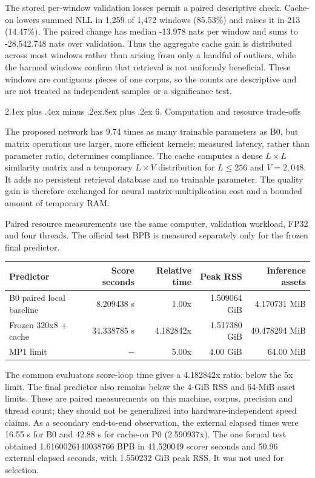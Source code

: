 \documentclass[11pt]{article}
\makeatletter
\renewcommand\section{\@startsection{section}{1}{0pt}%
  {2.1ex plus .4ex minus .2ex}{.8ex plus .2ex}%
  {\normalfont\large\bfseries}}
\makeatother
\begin{document}
The stored per-window validation losses permit a paired descriptive
check. Cache-on lowers summed NLL in 1,259 of 1,472 windows (85.53\%) and
raises it in 213 (14.47\%). The paired change has median -13.978 nats per
window and sums to -28,542.748 nats over validation. Thus the aggregate
cache gain is distributed across most windows rather than arising from
only a handful of outliers, while the harmed windows confirm that
retrieval is not uniformly beneficial. These windows are contiguous
pieces of one corpus, so the counts are descriptive and are not treated
as independent samples or a significance test.

\section{6. Computation and resource
trade-offs}\label{6-computation-and-resource-trade-offs}

The proposed network has 9.74 times as many trainable parameters as B0,
but matrix operations use larger, more efficient kernels; measured
latency, rather than parameter ratio, determines compliance. The cache
computes a dense \(L\times L\) similarity matrix and a temporary
\(L\times V\) distribution for \(L\leq256\) and \(V=2,048\). It adds no
persistent retrieval database and no trainable parameter. The quality
gain is therefore exchanged for neural matrix-multiplication cost and a
bounded amount of temporary RAM.

Paired resource measurements use the same computer, validation workload,
FP32 and four threads. The official test BPB is measured separately only
for the frozen final predictor.

\begin{longtable}[]{@{}lrrrr@{}}
\toprule\noalign{}
Predictor & Score seconds & Relative time & Peak RSS & Inference
assets \\
\midrule\noalign{}
\endhead
\bottomrule\noalign{}
\endlastfoot
B0 paired local baseline & 8.209438 s & 1.00x & 1.509064 GiB & 4.170731
MiB \\
Frozen 320x8 + cache & 34.338785 s & 4.182842x & 1.517380 GiB &
40.478294 MiB \\
MP1 limit & -\/- & 5.00x & 4.00 GiB & 64.00 MiB \\
\end{longtable}

The common evaluator\textquotesingle s score-loop time gives a 4.182842x
ratio, below the 5x limit. The final predictor also remains below the
4-GiB RSS and 64-MiB asset limits. These are paired measurements on this
machine, corpus, precision and thread count; they should not be
generalized into hardware-independent speed claims. As a secondary
end-to-end observation, the external elapsed times were 16.55 s for B0
and 42.88 s for cache-on P0 (2.590937x). The one formal test obtained
1.6160026140038766 BPB in 41.520049 scorer seconds and 50.96 external
elapsed seconds, with 1.550232 GiB peak RSS. It was not used for
selection.
\end{document}

